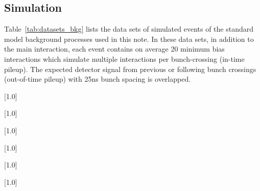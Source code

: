\subsection{Simulation}

Table~\ref{tab:datasets_bkg} lists the data sets of simulated events
of the standard model background processes used in this note. In these
data sets, in addition to the main interaction, each event contains on
average 20 minimum bias interactions which simulate multiple
interactions per bunch-crossing (in-time pileup). The expected detector
signal from previous or following bunch crossings (out-of-time pileup)
with 25ns bunch spacing is overlapped.

 \begin{table}[!h]
  \centering
  \scriptsize
  \scalebox{.7}[1.0]{}
  \label{tab:datasets_bkg}
 \end{table}

\begin{table}[!p]
 \centering
 \scriptsize
 \scalebox{.7}[1.0]{}
\end{table}

\begin{table}[!p]
 \centering
{}
 \scriptsize
 \scalebox{.7}[1.0]{}
\end{table}

\begin{table}[!p]
 \centering
{}
 \scriptsize
 \scalebox{.7}[1.0]{}
\end{table}

\begin{table}[!p]
 \centering
{}
 \scriptsize
 \scalebox{.7}[1.0]{}
\end{table}

\begin{table}[!p]
 \centering
{}
 \tiny
 \scalebox{.7}[1.0]{}
\end{table}

